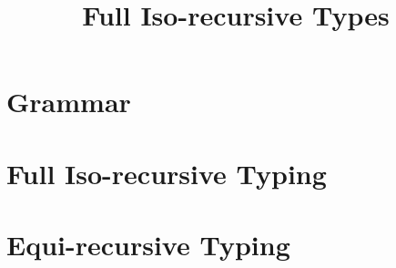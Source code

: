 \documentclass[a4paper]{article}
\title{Full Iso-recursive Types}
\begin{document}
\maketitle



\section{Grammar}

\ottgrammar


\section{Full Iso-recursive Typing}

\ottdefnsWellFormedTypeEnv

\ottdefnsWellFormedTermEnv

\ottdefnsWellFormedType

\ottdefnsTypCast


\ottdefnsTyping

\section{Equi-recursive Typing}
\end{document}
